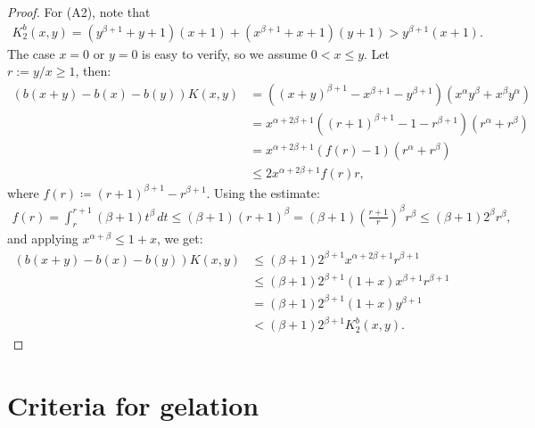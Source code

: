 \documentclass[a4paper,11pt]{article}
\begin{document}
\begin{proof}
For (A2), note that
 \begin{align*}
K_2^b(x,y)
=(y^{\beta+1}+y+1)(x+1)+(x^{\beta+1}+x+1)(y+1) > y^{\beta+1}(x+1).
\end{align*}
The case $x=0$ or $y=0$ is easy to verify, so we assume $0<x\le y$. 
Let $r:=y/x\ge 1$, then:
    \begin{align*}
    ({b(x+y)-b(x)-b(y)}) K(x,y)
    &=((x+y)^{\beta+1}-x^{\beta+1}-y^{\beta+1})(x^\alpha y^\beta + x^\beta y^\alpha)\\
    &=x^{\alpha+2\beta+1}\left( \left(r+1\right)^{\beta+1}-1-r^{\beta+1}\right)\left(r^{\alpha}+r^{\beta}\right)\\
    &=x^{\alpha+2\beta+1}\left(f(r)-1\right)(r^\alpha + r^\beta) \\
    &\leq 2x^{\alpha+2\beta+1}f(r)r,
  \end{align*}
where
$f(r)\coloneq (r+1)^{\beta+1} - r^{\beta+1}$.
Using the estimate:
\begin{align*}
  f(r) = \int_{r}^{r+1}(\beta +1)t^\beta\,dt 
  \leq (\beta +1)(r+1)^\beta 
  =(\beta +1)\left(\frac{r+1}{r}\right)^\beta r^\beta 
  \leq(\beta +1)2^\beta r^\beta,
\end{align*}
and applying $x^{\alpha+\beta}\leq 1+x$, we get:
\begin{align*}
  ({b(x+y)-b(x)-b(y)}) K(x,y)
  &\leq 
  (\beta +1)2^{\beta+1} x^{\alpha+2\beta+1}r^{\beta+1} \\
  &\leq(\beta +1)2^{\beta+1} (1+x)x^{\beta+1}r^{\beta+1} \\
  &=(\beta +1)2^{\beta+1}(1+x)y^{\beta+1} \\
  &< (\beta +1)2^{\beta+1} K_2^b(x,y).
\end{align*}
\end{proof}

\section{Criteria for gelation}\label{sec:6}
\setcounter{equation}{0}
\end{document}

